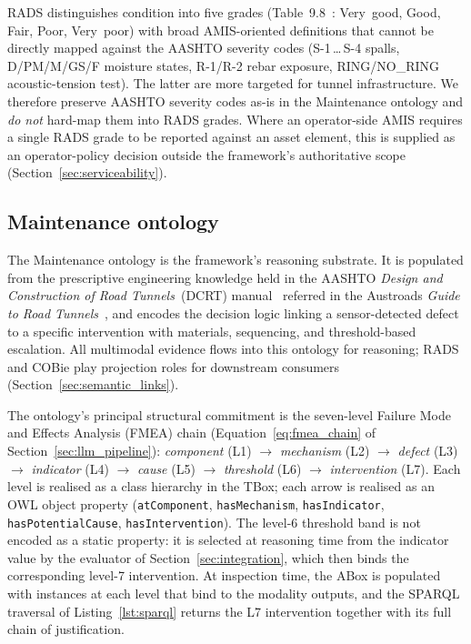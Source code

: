 \documentclass[11pt,a4paper]{article}
\begin{document}
RADS distinguishes condition into five grades (Table~9.8~\citep{AustroadsRADS2022}: Very~good, Good, Fair, Poor, Very~poor) with broad AMIS-oriented definitions that cannot be directly mapped against the AASHTO severity codes (S-1\,\ldots\,S-4 spalls, D/PM/M/GS/F moisture states, R-1/R-2 rebar exposure, RING/NO\_RING acoustic-tension test). The latter are more targeted for tunnel infrastructure. We therefore preserve AASHTO severity codes as-is in the Maintenance ontology and \emph{do not} hard-map them into RADS grades. Where an operator-side AMIS requires a single RADS grade to be reported against an asset element, this is supplied as an operator-policy decision outside the framework's authoritative scope (Section~\ref{sec:serviceability}).

\subsection{Maintenance ontology}
\label{sec:maint_onto}

The Maintenance ontology is the framework's reasoning substrate. It is populated from the prescriptive engineering knowledge held in the AASHTO \emph{Design and Construction of Road Tunnels}~(DCRT) manual~\citep{AASHTO2009} referred in the Austroads \emph{Guide to Road Tunnels}~\citep{Austroads2024}, and encodes the decision logic linking a sensor-detected defect to a specific intervention with materials, sequencing, and threshold-based escalation. All multimodal evidence flows into this ontology for reasoning; RADS and COBie play projection roles for downstream consumers (Section~\ref{sec:semantic_links}).

The ontology's principal structural commitment is the seven-level Failure Mode and Effects Analysis (FMEA) chain (Equation~\eqref{eq:fmea_chain} of Section~\ref{sec:llm_pipeline}):
\emph{component} (L1) $\to$ \emph{mechanism} (L2) $\to$ \emph{defect} (L3) $\to$ \emph{indicator} (L4) $\to$ \emph{cause} (L5) $\to$ \emph{threshold} (L6) $\to$ \emph{intervention} (L7). Each level is realised as a class hierarchy in the TBox; each arrow is realised as an OWL object property (\texttt{atComponent}, \texttt{hasMechanism}, \texttt{hasIndicator}, \texttt{hasPotentialCause}, \texttt{hasIntervention}). The level-6 threshold band is not encoded as a static property: it is selected at reasoning time from the indicator value by the evaluator of Section~\ref{sec:integration}, which then binds the corresponding level-7 intervention. At inspection time, the ABox is populated with instances at each level that bind to the modality outputs, and the SPARQL traversal of Listing~\ref{lst:sparql} returns the L7 intervention together with its full chain of justification.
\end{document}
